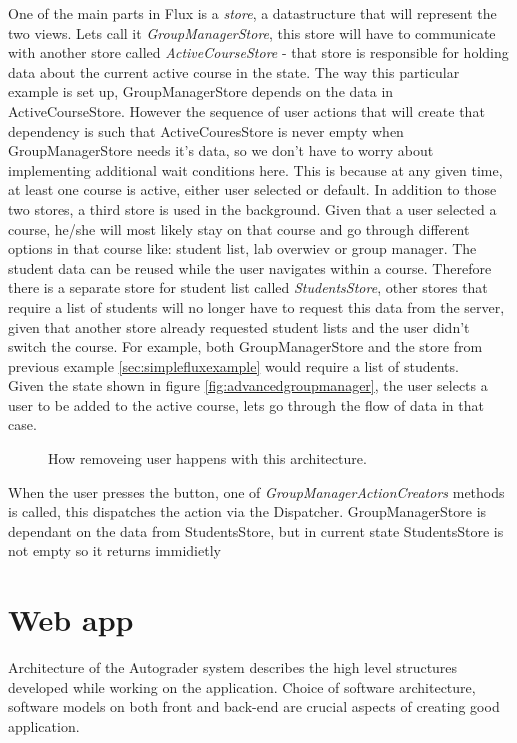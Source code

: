 One of the main parts in Flux is a \emph{store}, a datastructure that will represent the two views. Lets call it \emph{GroupManagerStore}, this store will have to communicate with another store called \emph{ActiveCourseStore} - that store is responsible for holding data about the current active course in the state. The way this particular example is set up, GroupManagerStore depends on the data in ActiveCourseStore. However the sequence of user actions that will create that dependency is such that ActiveCouresStore is never empty when GroupManagerStore needs it's data, so we don't have to worry about implementing additional wait conditions here. This is because at any given time, at least one course is active, either user selected or default. In addition to those two stores, a third store is used in the background. Given that a user selected a course, he/she will most likely stay on that course and go through different options in that course like: student list, lab overwiev or group manager. The student data can be reused  while the user navigates within a course. Therefore there is a separate store for student list called \emph{StudentsStore}, other stores that require a list of students will no longer have to request this data from the server, given that another store already requested student lists and the user didn't switch the course. For example, both GroupManagerStore and the store from previous example \ref{sec:simplefluxexample} would require a list of students.
\\Given the state shown in figure \ref{fig:advancedgroupmanager}, the user selects a user to be added to the active course, lets go through the flow of data in that case.

\begin{figure}[h]
  \scalebox{0.8}{}
  \caption{How removeing user happens with this architecture.}
  \label{fig:advancedfluxaddstudent}
\end{figure}

When the user presses the button, one of \emph{GroupManagerActionCreators} methods is called, this dispatches the action via the Dispatcher. GroupManagerStore is dependant on the data from StudentsStore, but in current state StudentsStore is not empty so it returns immidietly 

\newpage
\section{Web app}
Architecture of the Autograder system describes the high level structures developed while working on the application. Choice of software architecture, software models on both front and back-end are crucial aspects of creating good application.

